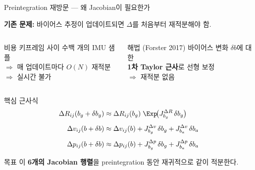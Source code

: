 
\begin{frame}{Preintegration 재방문 — 왜 Jacobian이 필요한가}

  \textbf{기존 문제:} 바이어스 추정이 업데이트되면 $\Delta$를 처음부터 재적분해야 함.

  \pause
  \vspace{0.4em}
  \begin{columns}
    \begin{alertblock}{비용}
      키프레임 사이 수백 개의 IMU 샘플\\
      $\Rightarrow$ 매 업데이트마다 $O(N)$ 재적분\\
      $\Rightarrow$ 실시간 불가
    \end{alertblock}

    \begin{exampleblock}{해법 (Forster 2017)}
      바이어스 변화 $\delta b$에 대한\\
      \textbf{1차 Taylor 근사}로 선형 보정\\
      $\Rightarrow$ 재적분 없음
    \end{exampleblock}
  \end{columns}

  \pause
  \vspace{0.5em}
  \begin{block}{핵심 근사식}
    \begin{align*}
      \Delta R_{ij}(b_g + \delta b_g)
        &\approx \Delta R_{ij}(b_g)\;\Exp\!\bigl(J_{b_g}^{\Delta R}\,\delta b_g\bigr)\\[4pt]
      \Delta v_{ij}(b + \delta b)
        &\approx \Delta v_{ij}(b)
          + J_{b_g}^{\Delta v}\,\delta b_g
          + J_{b_a}^{\Delta v}\,\delta b_a\\[4pt]
      \Delta p_{ij}(b + \delta b)
        &\approx \Delta p_{ij}(b)
          + J_{b_g}^{\Delta p}\,\delta b_g
          + J_{b_a}^{\Delta p}\,\delta b_a
    \end{align*}
  \end{block}

  \pause
  \vspace{0.2em}
  \begin{alertblock}{목표}
    이 \textbf{6개의 Jacobian 행렬}을 preintegration 동안 재귀적으로 같이 적분한다.
  \end{alertblock}
\end{frame}

